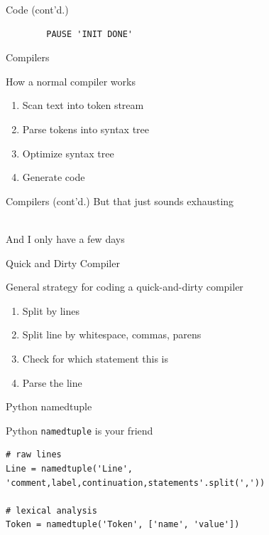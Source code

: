 \documentclass{beamer}
\def\py{
  \lstset{
     language=Python,
     extendedchars=true,
     basicstyle=\footnotesize\ttfamily,
     showstringspaces=false,
     showspaces=false,
     numbersep=9pt,
     tabsize=2,
     breaklines=true,
     showtabs=false,
     captionpos=b
  }
}
\def\fortran{
  \lstset{
     language=[77]FORTRAN,
     keywordstyle=\bfseries,
     extendedchars=true,
     basicstyle=\footnotesize\ttfamily,
     showstringspaces=false,
     showspaces=false,
     numbersep=9pt,
     tabsize=8,
     breaklines=true,
     showtabs=false,
     captionpos=b
  }
}
\begin{document}
\begin{frame}[fragile]{Code (cont'd.)}
\fortran
\begin{lstlisting}
        PAUSE 'INIT DONE'
\end{lstlisting}
\end{frame}
\begin{frame}{Compilers}


\begin{block}{How a normal compiler works}
  \begin{enumerate}
    \item Scan text into token stream
    \item Parse tokens into syntax tree
    \item Optimize syntax tree
    \item Generate code
  \end{enumerate}
\end{block}
\end{frame}

\begin{frame}{Compilers (cont'd.)}
But that just sounds exhausting

\ \\

And I only have a few days
\end{frame}
\begin{frame}{Quick and Dirty Compiler}

\begin{block}{General strategy for coding a quick-and-dirty compiler}
\begin{enumerate}
\item Split by lines
\item Split line by whitespace, commas, parens
\item Check for which statement this is
\item Parse the line
\end{enumerate}
\end{block}

\end{frame}


\begin{frame}[fragile]{Python namedtuple}
\begin{block}{Python \texttt{namedtuple} is your friend}
\py
\begin{lstlisting}
# raw lines
Line = namedtuple('Line', 'comment,label,continuation,statements'.split(','))

# lexical analysis
Token = namedtuple('Token', ['name', 'value'])
\end{lstlisting}
\end{block}
\end{frame}
\end{document}
